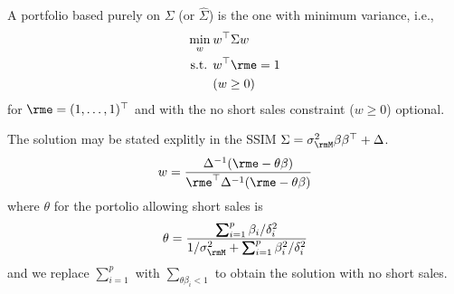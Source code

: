 \documentclass[leqno,12pt]{article}
\begin{document}
{A portfolio based purely on $\Sigma$ (or $\hat{\Sigma}$)
is the one with minimum variance, i.e.,
\begin{equation}
\begin{aligned}
  \min_w \s[2] &w^\top \Sigma w \\
 \text{s.t. }  &w^\top \rme = 1 \\
      &(w \ge 0)
\end{aligned}
\end{equation}
for $\rme = (1,\dots, 1)^\top$ and
with the no short sales constraint ($w \ge 0$) optional.

The solution may be stated explitly in the SSIM $\Sigma
= \mv^2 \beta \beta^\top + \Delta$.
\[  w = 
\frac{\Delta^{-1} (\rme - \theta \beta)}
{\rme^\top \Delta^{-1} (\rme - \theta \beta)}
\]
where $\theta$ for the portolio allowing short sales is
\begin{align}
 \theta = \frac{ \sum_{i=1}^p \beta_i/\delta_i^2}
{1/\mv^2 +  \sum_{i=1}^p \beta^2_i/\delta_i^2}
\end{align}
and we replace $\sum_{i=1}^p$ with $\sum_{\theta\beta_i <1}$
to obtain the solution with no short sales.


}
\end{document}
